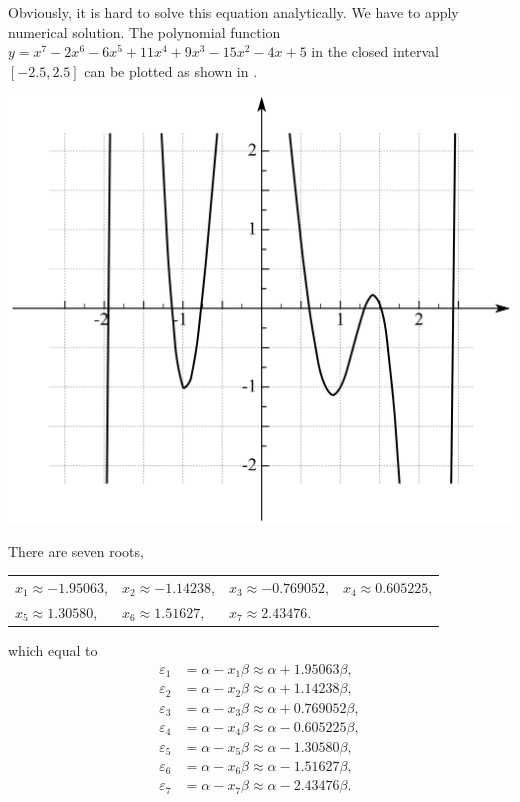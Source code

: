 		Obviously, it is hard to solve this equation analytically. We have to apply numerical solution. The polynomial function $y=x^7 - 2x^6 - 6x^5 + 11x^4 + 9x^3 -15x^2 -4x +5$ in the closed interval $[-2.5, 2.5]$ can be plotted as shown in .
		
		\begin{center}
		\includegraphics[scale=1]{./structures/exercise_1/phenanthrene/997.png}
		\label{fig:poly_a2}
		\end{center}				
		There are seven roots,
		\begin{center}
		\begin{tabular}{llll}
			$x_1 \approx -1.95063$, & $x_2 \approx -1.14238$, & $x_3 \approx -0.769052$, & $x_4 \approx 0.605225 $, \\
			$x_5 \approx 1.30580$, & $x_6\approx 1.51627$, & $x_7 \approx 2.43476$. &
		\end{tabular}
		\end{center}
		which equal to	
		\begin{align}
			\varepsilon_1 &= \alpha - x_1 \beta \approx \alpha + 1.95063 \beta , \\
			\varepsilon_2 &= \alpha - x_2 \beta\approx \alpha + 1.14238 \beta , \\
			\varepsilon_3 &= \alpha - x_3 \beta\approx \alpha + 0.769052 \beta , \\
			\varepsilon_4 &= \alpha - x_4 \beta\approx \alpha - 0.605225 \beta , \\
			\varepsilon_5 &= \alpha - x_5 \beta\approx \alpha - 1.30580 \beta , \\
			\varepsilon_6 &= \alpha - x_6 \beta\approx \alpha - 1.51627 \beta , \\
			\varepsilon_7 &= \alpha - x_7 \beta\approx \alpha - 2.43476 \beta .
		\end{align}
		
